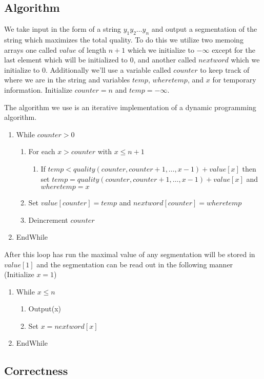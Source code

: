 \documentclass{article}
\begin{document}
\subsection{Algorithm}
We take input in the form of a string $y_1y_2\dots y_n$ and output a segmentation of the string which maximizes the total quality. To do this we utilize two memoing arrays one called $value$ of length $n+1$ which we initialize to $-\infty$ except for the last element which will be initialized to 0, and another called $nextword$ which we initialize to $0$. Additionally we'll use a variable called $counter$ to keep track of where we are in the string and variables $temp$, $wheretemp$, and $x$ for temporary information. Initialize $counter = n$ and $temp=-\infty$. 

The algorithm we use is an iterative implementation of a dynamic programming algorithm.
\begin{enumerate}
\item While $counter >0$
\begin{enumerate}
\item For each $x>counter$  with $x \leq  n+1$
\begin{enumerate}
\item If $temp < quality(counter,counter+1,\dots , x-1) + value[x]$ then set $temp=quality(counter,counter+1,\dots , x-1) + value[x]$ and $wheretemp = x$ 
\end{enumerate}
\item Set $value[counter] = temp$ and $nextword[counter] = wheretemp$
\item Deincrement $counter$
\end{enumerate}
\item EndWhile
\end{enumerate}
After this loop has run the maximal value of any segmentation will be stored in $value[1]$ and the segmentation can be read out in the following manner (Initialize $x=1$)
\begin{enumerate}
\item While $x\leq n$
\begin{enumerate}
\item Output(x)
\item Set $x=nextword[x]$
\end{enumerate}
\item EndWhile
\end{enumerate}


\subsection{Correctness}
\end{document}
